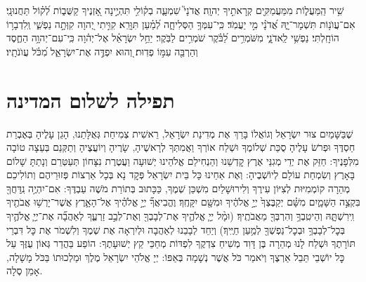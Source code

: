 \documentclass[a4paper, twoside, openany, parskip=half, 10pt]{article}
\begin{document}
שִׁ֥יר הַֽמַּעֲל֑וֹת מִמַּעֲמַקִּ֖ים קְרָאתִ֣יךָ יְהוָֽה׃
אֲדֹנָי֮ שִׁמְעָ֪ה בְק֫וֹלִ֥י תִּהְיֶ֣ינָה אָ֭זְנֶיךָ קַשֻּׁב֑וֹת לְ֝ק֗וֹל תַּחֲנוּנָֽי׃
אִם־עֲוֺנ֥וֹת תִּשְׁמָר־יָ֑הּ אֲ֝דֹנָ֗י מִ֣י יַעֲמֹֽד׃
כִּֽי־עִמְּךָ֥ הַסְּלִיחָ֑ה לְ֝מַ֗עַן תִּוָּרֵֽא׃
קִוִּ֣יתִי יְ֭הוָה קִוְּתָ֣ה נַפְשִׁ֑י וְֽלִדְבָר֥וֹ הוֹחָֽלְתִּי׃
נַפְשִׁ֥י לַֽאדֹנָ֑י מִשֹּׁמְרִ֥ים לַ֝בֹּ֗קֶר שֹׁמְרִ֥ים לַבֹּֽקֶר׃
יַחֵ֥ל יִשְׂרָאֵ֗ל אֶל־יְה֫וָה כִּֽי־עִם־יְהוָ֥ה הַחֶ֑סֶד וְהַרְבֵּ֖ה עִמּ֣וֹ פְדֽוּת׃
וְ֭הוּא יִפְדֶּ֣ה אֶת־יִשְׂרָאֵ֑ל מִ֝כֹּ֗ל עֲוֺנֹתָֽיו׃



\section*{תפילה לשלום המדינה}
\vspace{-.5\baselineskip}
\begin{multicols}{2}
 שֶׁבַּשָּׁמַיִם צוּר יִשְׂרָאֵל וְגוֹאֲלוֹ בָּרֵךְ אֶת מְדִינַת יִשְׂרָאֵל, רֵאשִׁית צְמִיחַת גְּאֻלָּתֵנוּ, הָגֵן עָלֶיהָ בְּאֶבְרַת חַסְדֶּךָ וּפְרֹשׂ עָלֶיהָ סֻכַּת שְׁלוֹמֶךָ וּשְׁלַח אוֹרְךָ וַאֲמִתְּךָ לְרָאשֶׁיהָ, שָׂרֶיהָ וְיוֹעֲצֶיהָ וְתַקְּנֵם בְּעֵצָה טוֹבָה מִלְּפָנֶיךָ: חַזֵּק אֶת יְדֵי מְגִנֵּי אֶרֶץ קׇדְשֵׁנוּ וְהַנְחִילֵם אֱלֹהֵינוּ יְשׁוּעָה וַעֲטֶרֶת נִצָּחוֹן תְּעַטְּרֵם וְנָתַתָּ שָׁלוֹם בָּאָרֶץ וְשִׂמְחַת עוֹלָם לְיוֹשְׁבֶיהָ:
וְאֶת אַחֵינוּ כָּל בֵּית יִשְׂרָאֵל פְּקׇד נָא בְּכָל אַרְצוֹת פְּזוּרֵיהֶם וְתוֹלִיכֵם מְהֵרָה קוֹמְמִיּוּת לְצִיּוֹן עִירֶךָ וְלִירוּשָׁלַיִם מִשְׁכַּן שְׁמֶךָ, כַּכָּתוּב בְּתוֹרַת מֹשֶׁה עַבְדֶּךָ:
אִם־יִהְיֶ֥ה נִֽדַּחֲךָ֖ בִּקְצֵ֣ה הַשָּׁמָ֑יִם מִשָּׁ֗ם יְקַבֶּצְךָ֙ יְיָ֣ אֱלֹהֶ֔יךָ וּמִשָּׁ֖ם יִקָּחֶֽךָ׃
וֶהֱבִיאֲךָ֞ יְיָ֣ אֱלֹהֶ֗יךָ אֶל־הָאָ֛רֶץ אֲשֶׁר־יָרְשׁ֥וּ אֲבֹתֶ֖יךָ וִֽירִשְׁתָּ֑הּ וְהֵיטִֽבְךָ֥ וְהִרְבְּךָ֖ מֵאֲבֹתֶֽיךָ׃ 
(וּמָ֨ל יְיָ֧ אֱלֹהֶ֛יךָ אֶת־לְבָבְךָ֖ וְאֶת־לְבַ֣ב זַרְעֶ֑ךָ לְאַהֲבָ֞ה אֶת־יְיָ֧ אֱלֹהֶ֛יךָ בְּכׇל־לְבָבְךָ֥ וּבְכׇל־נַפְשְׁךָ֖ לְמַ֥עַן חַיֶּֽיךָ׃)
וְיַחֵד לְבָבֵנוּ לְאַהֲבָה וּלְיִרְאָה אֶת שְׁמֶךָ וְלִשְׁמֹר אֶת כׇּל דִּבְרֵי תּוֹרָתֶךָ וּשְׁלַח לָנוּ מְהֵרָה בֶּן דָּוִד מְשִׁיחַ צִדְקֶךָ לִפְדּוֹת מְחַכֵּי קֵץ יְשׁוּעָתֶךָ: הוֹפַע בַּהֲדַר גְּאוֹן עֻזֶּךָ עַל כׇּל יוֹשְׁבֵי תֵּבֵל אַרְצֶךָ וְיֹאמַר כֹּל אֲשֶׁר נְשָׁמָה בְּאַפּוֹ:
יְיָ אֱלֹהֵי יִשְׂרָאֵל מֶלֶךְ וּמַלְכוּתוֹ בַּכֹּל מָשָׁלָה, אָמֵן סֶלָה. 
\end{multicols}
\end{document}
